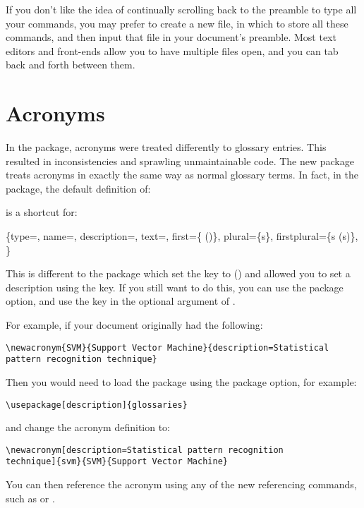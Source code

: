 \documentclass{nlctdoc}
\newenvironment{newway}{%
  \begin{labelledbox}{\styfmt{glossaries}}\ttfamily\obeylines
}{%
  \end{labelledbox}%
}
\begin{document}
If you don't like the idea of continually scrolling back to the
preamble to type all your  commands, you may
prefer to create a new file, in which to store all these commands,
and then input that file in your document's preamble. Most text
editors and front-ends allow you to have multiple files open, and
you can tab back and forth between them.

\section{Acronyms}

In the  package, acronyms were treated differently
to glossary entries. This resulted in inconsistencies and sprawling
unmaintainable code. The new  package treats
acronyms in exactly the same way as normal glossary terms. In fact,
in the  package, the default definition of:
\begin{newway}
\end{newway}
is a shortcut for:
\begin{newway}
\{type=,
name=,
description=,
text=,
first=\{ ()\},
plural=\{s\},
firstplural=\{s (s)\},
\}
\end{newway}

This is different to the  package which set the
 key to  () and
allowed you to set a description using the
 key. If you still want to do
this, you can use the  package option, and use
the  key in the optional
argument of .

For example, if your document originally had the following:
\begin{verbatim}
\newacronym{SVM}{Support Vector Machine}{description=Statistical
pattern recognition technique}
\end{verbatim}
Then you would need to load the  package using the
 package option, for example:
\begin{verbatim}
\usepackage[description]{glossaries}
\end{verbatim}
and change the acronym definition to:
\begin{verbatim}
\newacronym[description=Statistical pattern recognition 
technique]{svm}{SVM}{Support Vector Machine}
\end{verbatim}
You can then reference the acronym using any of the new referencing
commands, such as  or .
\end{document}
